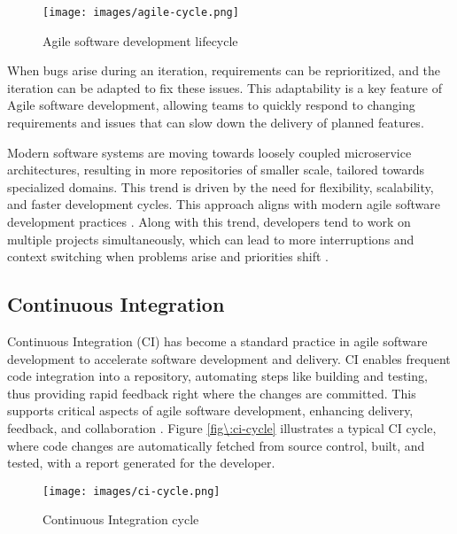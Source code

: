 \begin{figure}[H]
    \centering
    \texttt{[image: images/agile-cycle.png]}
    \caption{Agile software development lifecycle}
    \label{fig:agile-cycle}
\end{figure}

When bugs arise during an iteration, requirements can be reprioritized, and the iteration can be adapted to fix these issues. This adaptability is a key feature of Agile software development, allowing teams to quickly respond to changing requirements and issues that can slow down the delivery of planned features. %

Modern software systems are moving towards loosely coupled microservice architectures, resulting in more repositories of smaller scale, tailored towards specialized domains. This trend is driven by the need for flexibility, scalability, and faster development cycles. This approach aligns with modern agile software development practices \cite{francescoResearchArchitectingMicroservices2017}. Along with this trend, developers tend to work on multiple projects simultaneously, which can lead to more interruptions and context switching when problems arise and priorities shift \cite{tregubovImpactTaskSwitching2017, vasilescuSkyNotLimit2016}.

\subsection{Continuous Integration}

Continuous Integration (CI) has become a standard practice in agile software development to accelerate software development and delivery. CI enables frequent code integration into a repository, automating steps like building and testing, thus providing rapid feedback right where the changes are committed. This supports critical aspects of agile software development, enhancing delivery, feedback, and collaboration \cite{ugwuezeContinuousIntegrationDeployment2024}. Figure \ref{fig\:ci-cycle} illustrates a typical CI cycle, where code changes are automatically fetched from source control, built, and tested, with a report generated for the developer.

\begin{figure}[H]
    \centering
    \texttt{[image: images/ci-cycle.png]}
    \caption{Continuous Integration cycle}
    \label{fig:ci-cycle}
\end{figure}

